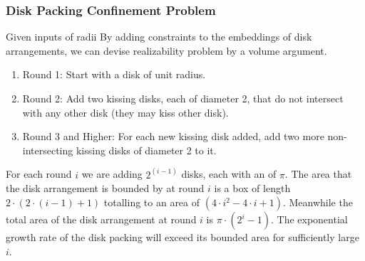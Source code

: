 \subsubsection{Disk Packing Confinement Problem}
Given inputs of radii 
By adding constraints to the embeddings of disk arrangements, we can devise realizability problem 
by a volume argument.
\begin{enumerate}%
\item Round 1: Start with a disk of unit radius.
\item Round 2: Add two kissing disks, each of diameter 2, that do not intersect with any other 
disk (they 
may kiss other
disk).
\item Round 3 and Higher: For each new kissing disk added, add two more non-intersecting kissing 
disks of diameter 2 to it.
\end{enumerate} 
For each round $i$ we are adding $2^{(i-1)}$ disks, each with an of $\pi$.  The area that 
the disk arrangement is bounded by at round $i$ is a box of length $2\cdot (2\cdot (i-1)+1)$ 
totalling to an area of $(4\cdot i^2 - 4\cdot i + 1)$.  Meanwhile the total area of the disk 
arrangement at round $i$ is $\pi \cdot (2^i - 1)$.  The exponential growth rate of the disk packing 
will exceed its bounded area for sufficiently large $i$.

